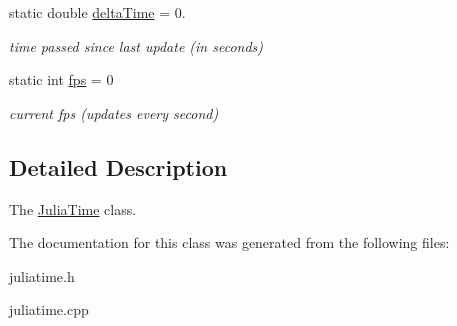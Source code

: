 \begin{DoxyCompactItemize}
\mbox{\label{classJuliaTime_a9bc0d5c43e2bfbefd25ff742d9aa3042}} 
static double \hyperlink{classJuliaTime_a9bc0d5c43e2bfbefd25ff742d9aa3042}{delta\+Time} = 0.
\begin{DoxyCompactList}\small\item\em time passed since last update (in seconds) \end{DoxyCompactList}\item 
\mbox{\label{classJuliaTime_ad2bffc176fa8c7d97e95459631d739d8}} 
static int \hyperlink{classJuliaTime_ad2bffc176fa8c7d97e95459631d739d8}{fps} = 0
\begin{DoxyCompactList}\small\item\em current fps (updates every second) \end{DoxyCompactList}\end{DoxyCompactItemize}


\subsection{Detailed Description}
The \hyperlink{classJuliaTime}{Julia\+Time} class. 

The documentation for this class was generated from the following files\+:\begin{DoxyCompactItemize}
\item 
juliatime.\+h\item 
juliatime.\+cpp\end{DoxyCompactItemize}
